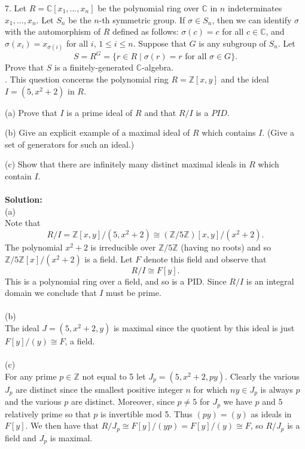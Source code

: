 \documentclass[11pt]{article}
\newcommand{\Z}{\mathbb{Z}}
\newcommand{\C}{\mathbb{C}}
\begin{document}
7. Let $R = \C[x_1, ..., x_n]$ be the polynomial ring over $\C$ in $n$ indeterminates
$x_1, ..., x_n$. Let $S_n$ be the $n$-th symmetric group. If $\sigma \in S_n$, then we can identify $\sigma $ with the
automorphism of $R$ defined as follows: $\sigma (c) = c$ for all $c \in\C$, and $\sigma (x_i) = x_{\sigma(i)}$
for all $i$,
$1 \le i \le n$. Suppose that $G$ is any subgroup of $S_n$. Let
 \[S = R^G = \{r\in R\mid \sigma(r) = r \text{ for all } \sigma\in G\}.
\]
Prove that $S$ is a finitely-generated $\C$-algebra.\\

. This question concerns the polynomial ring $R = \Z[x, y]$ and the ideal
$I = (5, x^2 + 2)$ in $R$.

(a) Prove that $I$ is a prime ideal of $R$ and that $R/I$ is a $PID$.

(b) Give an explicit example of a maximal ideal of $R$ which contains $I$.
(Give a set of generators for such an ideal.)

(c) Show that there are infinitely many distinct maximal ideals in $R$ which contain $I$.\\\\
\textbf{Solution:}\\
(a)\\
Note that \[
R/I = \Z[x,y]/(5,x^2+2) \cong (\Z/5\Z)[x,y]/(x^2+2).
\]
The polynomial $x^2+2$ is irreducible over $\Z/5\Z$ (having no roots) and so $\Z/5\Z[x]/(x^2+2)$ is a field. Let $F$ denote this field and observe that \[
R/I \cong F[y].
\]
This is a polynomial ring over a field, and so is a PID. Since $R/I$ is an integral domain we conclude that $I$ must be prime. \\\\
(b)\\
The ideal $J = (5,x^2+2, y)$ is maximal since the quotient by this ideal is just $F[y]/(y) \cong F$, a field.\\\\
(c)\\
For any prime $p\in\Z$ not equal to 5 let $J_p = (5,x^2+2, py)$. Clearly the various $J_p$ are distinct since the smallest positive integer $n$ for which $ny\in J_p$ is always $p$ and the various $p$ are distinct. Moreover, since $p\neq 5$ for $J_p$ we have $p$ and $5$ relatively prime so that $p$ is invertible mod 5. Thus $(py) = (y)$ as ideals in $F[y]$. We then have that $R/J_p \cong F[y]/(yp) = F[y]/(y) \cong F$, so $R/J_p$ is a field and $J_p$ is maximal. 
\end{document}
